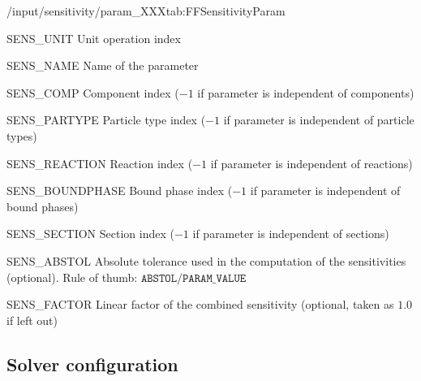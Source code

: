 \begin{groupscope}{/input/sensitivity/param\_XXX}{tab:FFSensitivityParam}
  \begin{dataset}[type = int, range={$\geq 0$}, length={$\geq 1$}]{SENS\_UNIT}
    Unit operation index
  \end{dataset}
  \begin{dataset}[type = string, range={See} ,length={$\geq 1$}]{SENS\_NAME}
    Name of the parameter
  \end{dataset}
  \begin{dataset}[type = int, range={$\geq -1$}, length={$\geq 1$}]{SENS\_COMP}
    Component index ($-1$ if parameter is independent of components)
  \end{dataset}
  \begin{dataset}[type = int, range={$\geq -1$}, length={$\geq 1$}]{SENS\_PARTYPE}
    Particle type index ($-1$ if parameter is independent of particle types)
  \end{dataset}
  \begin{dataset}[type = int, range={$\geq -1$}, length={$\geq 1$}]{SENS\_REACTION}
    Reaction index ($-1$ if parameter is independent of reactions)
  \end{dataset}
  \begin{dataset}[type = int, range={$\geq -1$}, length={$\geq 1$}]{SENS\_BOUNDPHASE}
    Bound phase index ($-1$ if parameter is independent of bound phases)
  \end{dataset}
  \begin{dataset}[type = int, range={$\geq -1$}, length={$\geq 1$}]{SENS\_SECTION}
    Section index ($-1$ if parameter is independent of sections)
  \end{dataset}
  \begin{dataset}[type = double, range={$\geq 0.0$}, length={$\geq 1$}]{SENS\_ABSTOL}
    Absolute tolerance used in the computation of the sensitivities (optional).
    Rule of thumb: $\texttt{ABSTOL} / \texttt{PARAM\_VALUE}$
  \end{dataset}
  \begin{dataset}[type = double, range={$\mathds{R}$} ,length={$\geq 1$}]{SENS\_FACTOR}
    Linear factor of the combined sensitivity (optional, taken as $1.0$ if left out)
  \end{dataset}
\end{groupscope}

\subsection{Solver configuration}

